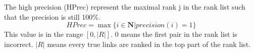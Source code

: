 \begin{definition}
  The high precision (HPrec) represent the maximal rank j in the rank list such that the precision is still 100\%.
  \begin{equation}
    HPrec = \max\{i \in \mathbf{N} | precision(i) = 1\}
  \end{equation}
  This value is in the range $\left[0, |R|\right]$.
  $0$ means the first pair in the rank list is incorrect.
  $|R|$ means every true links are ranked in the top part of the rank list.
\end{definition}
